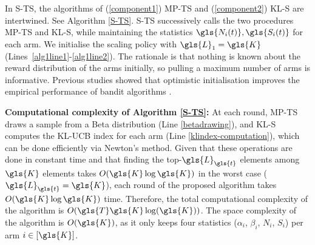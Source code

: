 In  \gls{S-TS}, the algorithms of (\ref{component1})  \gls{MP-TS} and (\ref{component2})  \gls{KL-S} are intertwined. 
See Algorithm \ref{S-TS}.   \gls{S-TS} successively calls the two procedures  \gls{MP-TS} and  \gls{KL-S}, 
while maintaining the statistics $\gls{N_i(t)}, \gls{S_i(t)}$ for each arm. 
We initialise the scaling policy with $\gls{L}_1 =  \gls{K}$ (Lines~\ref{alg1line1}-\ref{alg1line2}).
The rationale is that nothing is known about the reward distribution of the arms initially, so pulling a maximum number of arms is informative. Previous studies showed that optimistic initialisation improves the empirical performance of bandit algorithms \cite{DBLP:journals/corr/KuleshovP14, DBLP:books/lib/SuttonB98}. 

\textbf{Computational complexity of Algorithm \ref{S-TS}:}
At each round,  \gls{MP-TS} draws a sample from a Beta distribution (Line \ref{betadrawing}), and  \gls{KL-S} computes the  \gls{KL-UCB} index for each arm (Line \ref{klindex-computation}), which can be done efficiently via Newton's method. 
Given that these operations are done in constant time and that finding the top-$\gls{L}_{\gls{t}}$ elements among $ \gls{K}$ elements takes $O( \gls{K} \log  \gls{K})$ in the worst case ($\gls{L}_{\gls{t}} =  \gls{K}$), each round of the proposed algorithm takes $O( \gls{K} \log  \gls{K})$ time. Therefore, the total computational complexity of the algorithm is $O(\gls{T} \gls{K} \log(\gls{K}))$.
The space complexity of the algorithm is $O( \gls{K})$, as it only keeps four statistics ($\alpha_i$, $\beta_i$, $N_i$, $S_i$) per arm $i \in [ \gls{K}]$. 

